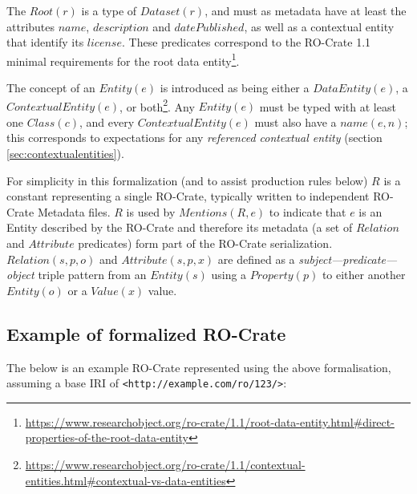The $Root(r)$ is a type of $Dataset(r)$, and must as metadata have at least the attributes $name$, $description$ and $datePublished$, as well as a contextual entity that identify its $license$. These predicates correspond to the RO-Crate 1.1 minimal requirements for the root data entity\footnote{
    \url{https://www.researchobject.org/ro-crate/1.1/root-data-entity.html\#direct-properties-of-the-root-data-entity}
}.

The concept of an $Entity(e)$ is introduced as being either a $DataEntity(e)$, a $ContextualEntity(e)$, or both\footnote{
    \url{https://www.researchobject.org/ro-crate/1.1/contextual-entities.html\#contextual-vs-data-entities}
}. Any $Entity(e)$ must be typed with at least one $Class(c)$, and every $ContextualEntity(e)$ must also have a $name(e,n)$; this corresponds to expectations for any \emph{referenced contextual entity} (section \ref{sec:contextualentities}). 

For simplicity in this formalization (and to assist production rules below) $R$ is a constant representing a single RO-Crate, typically written to independent RO-Crate Metadata files. $R$ is used by $Mentions(R, e)$ to indicate that $e$ is an Entity described by the RO-Crate and therefore its metadata (a set of $Relation$ and $Attribute$ predicates) form part of the RO-Crate serialization. $Relation(s, p, o)$ and $Attribute(s, p, x)$ are defined as a \emph{subject—predicate—object} triple pattern from an $Entity(s)$ using a $Property(p)$ to either another $Entity(o)$ or a $Value(x)$ value.

\subsection{Example of formalized RO-Crate}

The below is an example RO-Crate represented using the above formalisation, assuming a base IRI of \texttt{<http://example.com/ro/123/>}:

